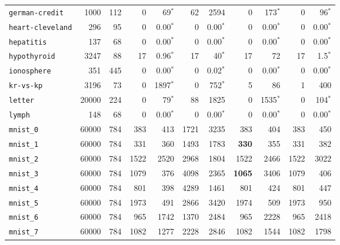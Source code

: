 \begin{tabular}{lccrrrrrrrr}
\texttt{german-credit} & \multicolumn{1}{r}{1000} & \multicolumn{1}{r}{112}  & 0 & 69$^*$ & 62 & 2594 & 0 & 173$^*$ & 0 & 96$^*$\\
\texttt{heart-cleveland} & \multicolumn{1}{r}{296} & \multicolumn{1}{r}{95}  & 0 & 0.00$^*$ & 0 & 0.00$^*$ & 0 & 0.00$^*$ & 0 & 0.00$^*$\\
\texttt{hepatitis} & \multicolumn{1}{r}{137} & \multicolumn{1}{r}{68}  & 0 & 0.00$^*$ & 0 & 0.00$^*$ & 0 & 0.00$^*$ & 0 & 0.00$^*$\\
\texttt{hypothyroid} & \multicolumn{1}{r}{3247} & \multicolumn{1}{r}{88}  & 17 & 0.96$^*$ & 17 & 40$^*$ & 17 & 72 & 17 & 1.5$^*$\\
\texttt{ionosphere} & \multicolumn{1}{r}{351} & \multicolumn{1}{r}{445}  & 0 & 0.00$^*$ & 0 & 0.02$^*$ & 0 & 0.00$^*$ & 0 & 0.00$^*$\\
\texttt{kr-vs-kp} & \multicolumn{1}{r}{3196} & \multicolumn{1}{r}{73}  & 0 & 1897$^*$ & 0 & 752$^*$ & 5 & 86 & 1 & 400\\
\texttt{letter} & \multicolumn{1}{r}{20000} & \multicolumn{1}{r}{224}  & 0 & 79$^*$ & 88 & 1825 & 0 & 1535$^*$ & 0 & 104$^*$\\
\texttt{lymph} & \multicolumn{1}{r}{148} & \multicolumn{1}{r}{68}  & 0 & 0.00$^*$ & 0 & 0.00$^*$ & 0 & 0.00$^*$ & 0 & 0.00$^*$\\
\texttt{mnist\_0} & \multicolumn{1}{r}{60000} & \multicolumn{1}{r}{784}  & 383 & 413 & 1721 & 3235 & 383 & 404 & 383 & 450\\
\texttt{mnist\_1} & \multicolumn{1}{r}{60000} & \multicolumn{1}{r}{784}  & 331 & 360 & 1493 & 1783 & \textbf{330} & 355 & 331 & 382\\
\texttt{mnist\_2} & \multicolumn{1}{r}{60000} & \multicolumn{1}{r}{784}  & 1522 & 2520 & 2968 & 1804 & 1522 & 2466 & 1522 & 3022\\
\texttt{mnist\_3} & \multicolumn{1}{r}{60000} & \multicolumn{1}{r}{784}  & 1079 & 376 & 4098 & 2365 & \textbf{1065} & 3406 & 1079 & 406\\
\texttt{mnist\_4} & \multicolumn{1}{r}{60000} & \multicolumn{1}{r}{784}  & 801 & 398 & 4289 & 1461 & 801 & 424 & 801 & 447\\
\texttt{mnist\_5} & \multicolumn{1}{r}{60000} & \multicolumn{1}{r}{784}  & 1973 & 491 & 2866 & 3420 & 1974 & 509 & 1973 & 950\\
\texttt{mnist\_6} & \multicolumn{1}{r}{60000} & \multicolumn{1}{r}{784}  & 965 & 1742 & 1370 & 2484 & 965 & 2228 & 965 & 2418\\
\texttt{mnist\_7} & \multicolumn{1}{r}{60000} & \multicolumn{1}{r}{784}  & 1082 & 1277 & 2228 & 2846 & 1082 & 1544 & 1082 & 1798\\

\end{tabular}
